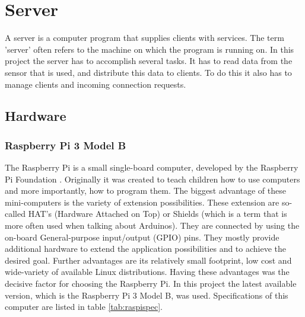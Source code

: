 \chapter{Server}
\label{ch:server}

\author{Nico Kratky}
%
A server is a computer program that supplies clients with services. The term 'server' often refers to the machine on which the program is running on. In this project the server has to accomplish several tasks. It has to read data from the sensor that is used, and distribute this data to clients. To do this it also has to manage clients and incoming connection requests.

\section{Hardware}
\subsection{Raspberry Pi 3 Model B}

The Raspberry Pi is a small single-board computer, developed by the Raspberry Pi Foundation \autocite{RasPi}. Originally it was created to teach children how to use computers and more importantly, how to program them. The biggest advantage of these mini-computers is the variety of extension possibilities. These extension are so-called HAT's (Hardware Attached on Top) or Shields (which is a term that is more often used when talking about Arduinos). They are connected by using the on-board General-purpose input/output (GPIO) pins. They mostly provide additional hardware to extend the application possibilities and to achieve the desired goal. Further advantages are its relatively small footprint, low cost and wide-variety of available Linux distributions. Having these advantages was the decisive factor for choosing the Raspberry Pi. In this project the latest available version, which is the Raspberry Pi 3 Model B, was used. Specifications of this computer are listed in table \vref{tab:raspispec}.

